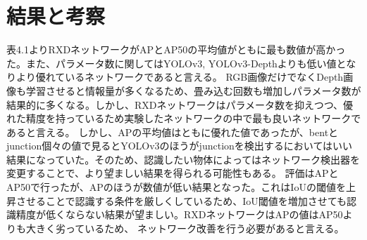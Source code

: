 \section{結果と考察}

\begin{table}[htbp]
\centering
\caption{物体検出ネットワークの実行結果}
\end{table}

表4.1よりRXDネットワークがAPとAP50の平均値がともに最も数値が高かった。また、パラメータ数に関してはYOLOv3, YOLOv3-Depthよりも低い値となりより優れているネットワークであると言える。
RGB画像だけでなくDepth画像も学習させると情報量が多くなるため、畳み込む回数も増加しパラメータ数が結果的に多くなる。しかし、RXDネットワークはパラメータ数を抑えつつ、優れた精度を持っているため実験したネットワークの中で最も良いネットワークであると言える。
しかし、APの平均値はともに優れた値であったが、bentとjunction個々の値で見るとYOLOv3のほうがjunctionを検出するにおいてはいい結果になっていた。そのため、認識したい物体によってはネットワーク検出器を変更することで、より望ましい結果を得られる可能性もある。
評価はAPとAP50で行ったが、APのほうが数値が低い結果となった。これはIoUの閾値を上昇させることで認識する条件を厳しくしているため、IoU閾値を増加させても認識精度が低くならない結果が望ましい。RXDネットワークはAPの値はAP50よりも大きく劣っているため、
ネットワーク改善を行う必要があると言える。


